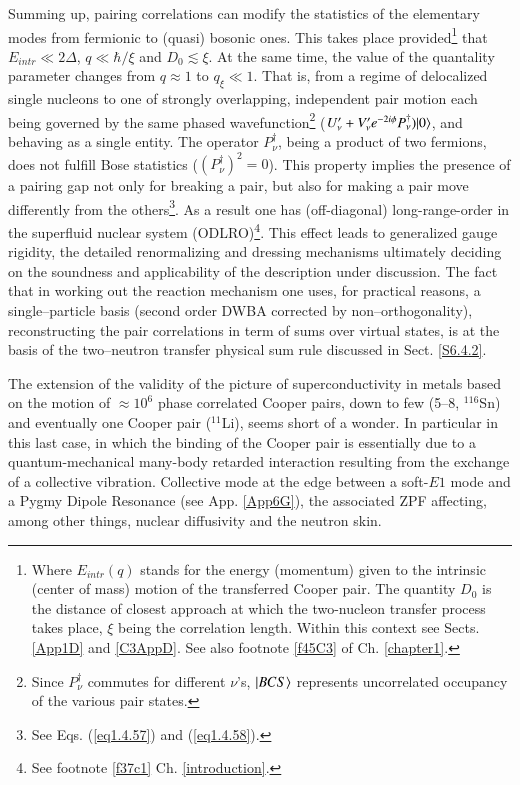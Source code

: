 \begin{subappendices}
Summing up, pairing correlations can modify the statistics of the elementary modes from fermionic to (quasi) bosonic ones. This takes place provided\footnote{Where $E_{intr}(q)$ stands for the energy (momentum) given to the intrinsic (center of mass) motion of the transferred Cooper pair. The quantity $D_0$ is the distance of closest approach at which the two-nucleon transfer process takes place, $\xi$ being the correlation length. Within this context see Sects. \ref{App1D} and \ref{C3AppD}. See also footnote \ref{f45C3} of Ch. \ref{chapter1}.} that $E_{intr}\ll2\Delta$, $q\ll\hbar/\xi$ and $D_0\lesssim\xi$. At the same time,  the value of the quantality parameter changes from $q\approx1$ to $q_\xi\ll 1$. That is,   from a regime of delocalized single nucleons to one of strongly overlapping, independent pair motion each being governed by the same phased wavefunction\footnote{Since $P^\dagger_\nu$ commutes for different $\nu$'s, $|{BCS} \rangle$ represents uncorrelated occupancy of the various pair states.} ($U'_{\nu}+V'_{\nu}e^{-2i\phi}P^\dagger_\nu)|{0} \rangle$, and behaving as a single entity. The operator $P^\dagger_\nu$, being a product of two fermions, does not fulfill Bose statistics ($(P^\dagger_\nu)^2=0$). This property implies the presence of a pairing gap not only for breaking a pair, but also for making a pair move differently from the others\footnote{See Eqs. (\ref{eq1.4.57}) and (\ref{eq1.4.58}).}. As a result one has (off-diagonal) long-range-order in the superfluid nuclear system 
 (ODLRO)\footnote{See footnote \ref{f37c1} Ch. \ref{introduction}.}.  This effect leads  to  generalized gauge rigidity, the detailed renormalizing and dressing mechanisms ultimately deciding on the soundness and applicability of the description under discussion. The fact that in working out the reaction mechanism one uses, for practical reasons, a single--particle basis (second order DWBA corrected by non--orthogonality), reconstructing the pair correlations in term of sums over virtual states, is at the basis of the two--neutron transfer physical sum rule discussed in Sect. \ref{S6.4.2}.
 
 The extension of the validity of the picture of superconductivity in metals based on the motion of $\approx10^{6}$ phase correlated Cooper pairs, down to few (5--8, $^{116}$Sn) and eventually  one Cooper pair ($^{11}$Li), seems short of a wonder. In particular in this last case, in which the binding of the Cooper pair is essentially due to a  quantum-mechanical many-body retarded interaction resulting from the exchange of a  collective vibration. Collective mode  at the edge between a soft-$E1$ mode and a Pygmy Dipole Resonance (see App. \ref{App6G}),  the associated ZPF affecting, among other things, nuclear diffusivity and the neutron skin.
 

\end{subappendices}
